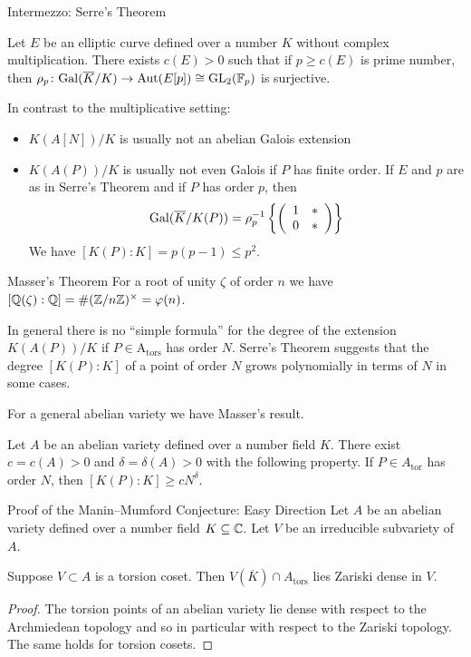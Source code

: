 \documentclass{beamer}
\begin{document}
\begin{frame}{Intermezzo: Serre's Theorem}
  \begin{theorem}[Serre]
    Let $E$ be  an elliptic curve defined over a number $K$
    \alert{without} complex multiplication.
    There exists $c(E)>0$ such that
    if $p\ge c(E)$ is prime number, then $\rho_p \colon
    \mathrm{Gal}(\overline{K}/K)\rightarrow \mathrm{Aut}(E[p]) \cong \mathrm{GL}_2({\mathbb{F}}_p)$
    is surjective.  
  \end{theorem}

  In contrast to the multiplicative setting:
  \begin{itemize}
  \item 
    $K(A[N])/K$ is usually \alert{not} an  \alert{abelian} Galois extension
  \item 
     $K(A(P))/K$ is usually  \alert{not}  even Galois if $P$ has finite
     order. If  $E$
     and $p$ are as in Serre's Theorem and if $P$ has order $p$, then
     \begin{equation*}
       \mathrm{Gal}(\overline K/K(P))=       \rho_p^{-1} \left\{\left( \begin{array}{cc} {1} & {*} \\ {0} & {*} \end{array} \right)\right\}
     \end{equation*}
     We have $[K(P):K] = p(p-1) \le p^2$. 
   \end{itemize}   
\end{frame}

\begin{frame}{Masser's Theorem}
  For a root of unity $\zeta$ of order $n$ we have $[{\mathbb{Q}}(\zeta):{\mathbb{Q}}] =
  \#({\mathbb{Z}}/n{\mathbb{Z}})^\times =\varphi(n)$.
  
  In general there is no ``simple formula'' for the degree of the
  extension $K(A(P))/K$ if $P\in \mathrm{A}_{\mathrm{tors}}$ has order
  $N$.
  Serre's Theorem
  suggests that the degree $[K(P):K]$ of a point of order $N$ grows
  polynomially in terms of $N$ in some cases.

  For a general abelian variety we have Masser's result. 
  
  \begin{theorem}[Masser]
    Let $A$ be an abelian variety defined over a number field $K$. There
    exist $c=c(A)>0$ and $\delta=\delta(A)>0$ with the following
    property. If $P \in A_{\mathrm{tor}}$ has order $N$, then
    $[K(P):K]\ge c N^{\delta}$. 
  \end{theorem}
\end{frame}

\begin{frame}{Proof of the Manin--Mumford Conjecture: Easy Direction}
  Let $A$ be an abelian variety defined over a number field
  $K\subseteq{\mathbb{C}}$.
  Let $V$ be an irreducible subvariety of $A$.

  
  \begin{lemma}
    Suppose $V\subset A$ is a torsion coset. Then $V(\overline K)\cap
    A_{\mathrm{tors}}$ lies Zariski dense in $V$. 
  \end{lemma}
  \begin{proof}
    The torsion points of an abelian variety lie dense with respect to
    the Archmiedean topology and so in particular with respect to the
    Zariski topology. The same holds for torsion cosets. 
  \end{proof}
\end{frame}
\end{document}

